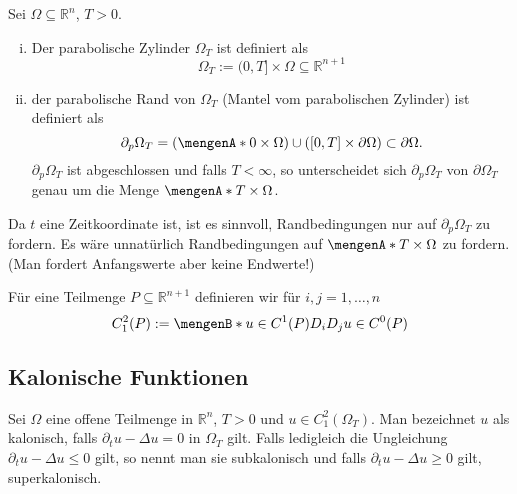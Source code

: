 \begin{definition}
	Sei $\Omega \subseteq \mathbb{R}^n$, $T >0$.
	\begin{enumerate}[(i)]
		\item Der parabolische Zylinder $\Omega_T$ ist definiert als
		\[
			\Omega_T := (0,T] \times \Omega \subseteq \mathbb{R}^{n+1}
		\]
		\item der parabolische Rand von $\Omega_T$ (Mantel vom parabolischen Zylinder) ist definiert als
		\[
			\partial_p \Omega_T = ( \set{0} \times \Omega) \cup ( [0,T] \times \partial \Omega) \subset \partial \Omega .
		\]
		$\partial_p \Omega_T$ ist abgeschlossen und falls $T < \infty$, 
		so unterscheidet sich $\partial_p \Omega_T$ von $\partial \Omega_T$ genau um die Menge $\set{T} \times \Omega$.
	\end{enumerate}
\end{definition}

\begin{bemerkung}
	Da $t$ eine Zeitkoordinate ist, ist es sinnvoll, Randbedingungen nur auf $\partial_p \Omega_T$ zu fordern. 
	Es wäre unnatürlich Randbedingungen auf $\set{T} \times \Omega$ zu fordern. (Man fordert Anfangswerte aber keine Endwerte!)
\end{bemerkung}
Für eine Teilmenge $P \subseteq \mathbb{R}^{n+1}$ definieren wir für $i,j=1,\dots,n$ 
\[
	C^2_1(P):= \set[u \in C^1(P)]{ D_iD_j u \in C^0(P)}
\]

\subsection{Kalonische Funktionen} 
\label{sub:kalonische_funktionen}

\begin{definition}
	Sei $\Omega$ eine offene Teilmenge in $\mathbb{R}^n$, $T >0$ und $u \in C^2_1(\Omega_T)$. Man bezeichnet $u$ als kalonisch, falls $\partial_t u - \Delta u =0$ in 
	$\Omega_T$ gilt. Falls ledigleich die Ungleichung $\partial_t u - \Delta u \leq 0$ gilt, so nennt man sie subkalonisch und falls $\partial_t u - \Delta u \geq 0$
	gilt, superkalonisch.
\end{definition}

